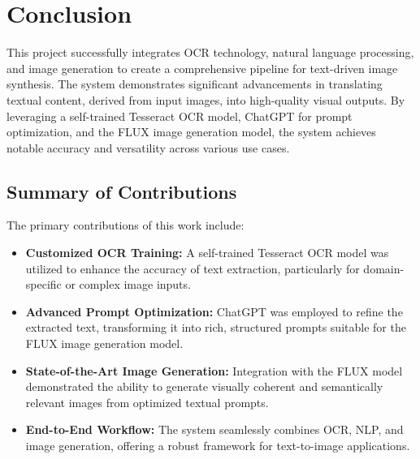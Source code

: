 \chapter{Conclusion}

This project successfully integrates OCR technology, natural language processing, and image generation to create a comprehensive pipeline for text-driven image synthesis. The system demonstrates significant advancements in translating textual content, derived from input images, into high-quality visual outputs. By leveraging a self-trained Tesseract OCR model, ChatGPT for prompt optimization, and the FLUX image generation model, the system achieves notable accuracy and versatility across various use cases.

\section{Summary of Contributions}
The primary contributions of this work include:
\begin{itemize}
    \item \textbf{Customized OCR Training:} A self-trained Tesseract OCR model was utilized to enhance the accuracy of text extraction, particularly for domain-specific or complex image inputs.
    \item \textbf{Advanced Prompt Optimization:} ChatGPT was employed to refine the extracted text, transforming it into rich, structured prompts suitable for the FLUX image generation model.
    \item \textbf{State-of-the-Art Image Generation:} Integration with the FLUX model demonstrated the ability to generate visually coherent and semantically relevant images from optimized textual prompts.
    \item \textbf{End-to-End Workflow:} The system seamlessly combines OCR, NLP, and image generation, offering a robust framework for text-to-image applications.
\end{itemize}

